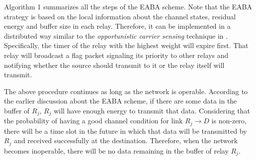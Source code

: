 \documentclass[conference]{IEEEtran}
\begin{document}
Algorithm 1 summarizes all the steps of the EABA scheme. Note that the EABA strategy is based on the local information about the channel states, residual energy and buffer size in each relay. Therefore, it can be implemented in a distributed way similar to the \emph{opportunistic carrier sensing} technique in \cite{4244758}. Specifically, the timer of the relay with the highest weight will expire first. That relay will broadcast a flag packet signaling its priority to other relays and notifying whether the source should transmit to it or the relay itself will transmit.

The above procedure continues as long as the network is operable. According to the earlier discussion about the EABA scheme, if there are some data in the buffer of $R_j$, $R_j$ will have enough energy to transmit that data. Considering that the probability of having a good channel condition for link $R_j \rightarrow D$ is non-zero, there will be a time slot in the future in which that data will be transmitted by $R_j$ and received successfully at the destination. Therefore, when the network becomes inoperable, there will be no data remaining in the buffer of relay $R_j$.
\end{document}
